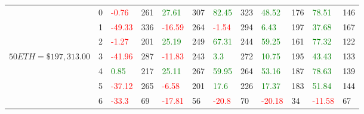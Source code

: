 \begin{table}[htb!]
\begin{adjustwidth}{-0.9in}{-0.9in}
\begin{tabular}{|p{5em}|p{2em}|p{3em}|p{3em}|p{3em}|p{3em}|p{3em}|p{3em}|p{3em}|p{3em}|p{3em}|p{3em}|}
            & 0 & \textcolor{red}{-0.76} & 261 & \textcolor{green}{27.61} & 307 & \textcolor{green}{82.45} & 323 & \textcolor{green}{48.52} & 176 & \textcolor{green}{78.51} & 146\\\cline{3-12}
            & 1 & \textcolor{red}{-49.33} & 336 & \textcolor{red}{-16.59} & 264 & \textcolor{red}{-1.54} & 294 & \textcolor{green}{6.43} & 197 & \textcolor{green}{37.68} & 167\\\cline{3-12}
            & 2 & \textcolor{red}{-1.27} & 201 & \textcolor{green}{25.19} & 249 & \textcolor{green}{67.31} & 244 & \textcolor{green}{59.25} & 161 & \textcolor{green}{77.32} & 122\\\cline{3-12}
            $50 ETH = \$197,313.00$ & 3 & \textcolor{red}{-41.96} & 287 & \textcolor{red}{-11.83} & 243 & \textcolor{green}{3.3} & 272 & \textcolor{green}{10.75} & 195 & \textcolor{green}{43.43} & 133\\[-3ex]\cline{3-12}
            & 4 & \textcolor{green}{0.85} & 217 & \textcolor{green}{25.11} & 267 & \textcolor{green}{59.95} & 264 & \textcolor{green}{53.16} & 187 & \textcolor{green}{78.63} & 139\\\cline{3-12}
            & 5 & \textcolor{red}{-37.12} & 265 & \textcolor{red}{-6.58} & 201 & \textcolor{green}{17.6} & 226 & \textcolor{green}{17.37} & 183 & \textcolor{green}{51.84} & 144\\\cline{3-12}
            & 6 & \textcolor{red}{-33.3} & 69 & \textcolor{red}{-17.81} & 56 & \textcolor{red}{-20.8} & 70 & \textcolor{red}{-20.18} & 34 & \textcolor{red}{-11.58} & 67\\\hline\hline


\end{tabular}
\end{adjustwidth}
\end{table}

